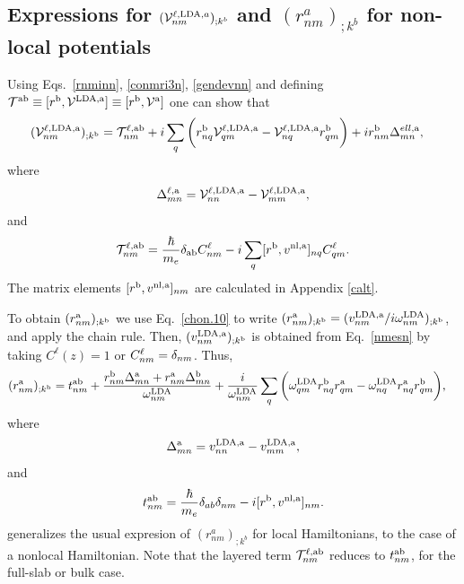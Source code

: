 \documentclass[floatfix,prb,aps,superscriptaddress,11pt,preprint,letterpaper]{revtex4}
\begin{document}
\subsection{Expressions for 
\texorpdfstring{$({\mathbf{\cal V}}^{\ell,\mathrm{LDA},a}_{nm})_{;k^b}$}{Vnonlocal}
and \texorpdfstring{$(r^a_{nm})_{;k^b}$}{Vnonlocal}
for non-local potentials}\label{appvnl}
Using Eqs.~\eqref{rnminn}, \eqref{conmri3n}, \eqref{gendevnn} and
defining 
$
{\cal T}^{\mathrm{a}\mathrm{b}}\equiv[r^{\mathrm{b}},{\mathbf{\cal V}}^{\mathrm{LDA},\mathrm{a}}]
\equiv
[r^{\mathrm{b}},{\mathbf{\cal V}}^{\mathrm{a}}]
$
one can show that
\begin{align}\label{nmesn}
({\mathbf{\cal V}}^{\ell,\mathrm{LDA},\mathrm{a}}_{nm})_{;k^{\mathrm{b}}}&=
{\cal T}_{nm}^{\ell,\mathrm{a}\mathrm{b}}
+i
\sum_{q}
\bigg(
r^{\mathrm{b}}_{nq}  
{\mathbf{\cal V}}^{\ell,\mathrm{LDA},\mathrm{a}}_{q m}
-
{\mathbf{\cal V}}^{\ell,\mathrm{LDA},\mathrm{a}}_{nq}   
r^{\mathrm{b}}_{q m}
\bigg)  
+i  
r^{\mathrm{b}}_{nm}
\Delta^{ell,\mathrm{a}}_{mn}
,
\end{align}  
where
\begin{eqnarray}\label{tdel}
\Delta^{\ell,\mathrm{a}}_{mn}
=
{\mathbf{\cal V}}^{\ell,\mathrm{LDA},\mathrm{a}}_{nn}  
-
{\mathbf{\cal V}}^{\ell,\mathrm{LDA},\mathrm{a}}_{mm}  
,
\end{eqnarray} 
and
\begin{align}\label{tau.1}
{\cal T}_{nm}^{\ell,\mathrm{a}\mathrm{b}}
=
\frac{\hbar}{m_e}\delta_{\mathrm{a}\mathrm{b}}
C^\ell_{nm} 
-i 
\sum_q 
[r^{\mathrm{b}},v^{\mathrm{nl},\mathrm{a}}]_{nq}C^\ell_{qm} 
.
\end{align}  
The matrix elements $[r^{\mathrm{b}},v^{\mathrm{nl},\mathrm{a}}]_{nm}$
are calculated in Appendix \ref{calt}.

To obtain $(r^{\mathrm{a}}_{nm})_{;k^{\mathrm{b}}}$ we use Eq.~\eqref{chon.10} to
write
$(r^{\mathrm{a}}_{nm})_{;k^{\mathrm{b}}}
=(v^{\mathrm{LDA},\mathrm{a}}_{nm}/i\omega^{\mathrm{LDA}}_{nm})_{;k^{\mathrm{b}}}
$, and apply the chain rule. 
Then, 
$(v^{\mathrm{LDA},\mathrm{a}}_{nm})_{;k^{\mathrm{b}}}$ is obtained
from Eq.~\eqref{nmesn} by
taking
$C^\ell(z)=1$ or $C^\ell_{nm}=\delta_{nm}$. Thus,
\begin{align}\label{na_rgendevn}
(r^{\mathrm{a}}_{nm})_{;k^{\mathrm{b}}}
&=
t^{\mathrm{a}\mathrm{b}}_{nm}
+
\frac{ 
r^{\mathrm{b}}_{nm}
\Delta^{\mathrm{a}}_{mn}
+r^{\mathrm{a}}_{nm}
\Delta^{\mathrm{b}}_{mn}
}
{\omega^{\mathrm{LDA}}_{nm}}
+
\frac{i}{\omega^{\mathrm{LDA}}_{nm}}
\sum_{q}
\bigg(
\omega^{\mathrm{LDA}}_{q m} 
r^{\mathrm{b}}_{nq} 
r^{\mathrm{a}}_{q m}
-
\omega^{\mathrm{LDA}}_{nq} 
r^{\mathrm{a}}_{nq} 
r^{\mathrm{b}}_{q m}
\bigg)
,
\end{align} 
where 
\begin{eqnarray}\label{del}
\Delta^{\mathrm{a}}_{mn}
=
v^{\mathrm{LDA},\mathrm{a}}_{nn}  
-
v^{\mathrm{LDA},\mathrm{a}}_{mm}  
,
\end{eqnarray}
and
\begin{align}\label{tau.1n} 
t_{nm}^{\mathrm{a}\mathrm{b}}
=\frac{\hbar}{m_e}\delta_{ab}\delta_{nm} 
-i [r^{\mathrm{b}},v^{\mathrm{nl},\mathrm{a}}]_{nm} 
.
\end{align}   
generalizes the usual expresion of
$(r^a_{nm})_{;k^b}$ for local 
Hamiltonians,\cite{aversaPRB95,nastosPRB05,cabellosPRB09,rashkeevPRB98}
to
the case of a
nonlocal Hamiltonian.
Note that the layered term
${\cal T}^{\ell,\mathrm{a}\mathrm{b}}_{nm}$ reduces to $t^{\mathrm{a}\mathrm{b}}_{nm}$, for the
full-slab or bulk case. 
\end{document}
